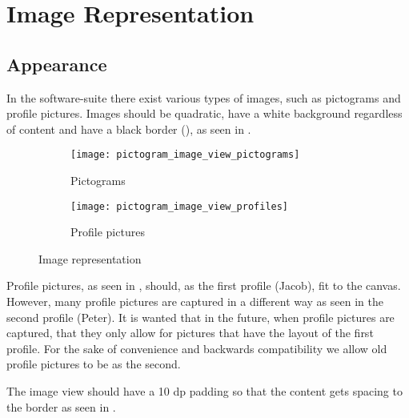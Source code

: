
\chapter{Image Representation}

\section{Appearance}
\label{sec:appearance}
In the \giraf software-suite there exist various types of images, such as pictograms and profile pictures. Images should be quadratic, have a white background regardless of content and have a black border (\colref{}), as seen in . 

\begin{figure}[!htbp]
    \centering

    \begin{subfigure}[t]{0.4\textwidth}
    	\centering
        \texttt{[image: pictogram\_image\_view\_pictograms]}
        \caption{Pictograms}
        \label{fig:pictogram_image_view_pictograms}
    \end{subfigure}
    \hspace{5em} 
    \begin{subfigure}[t]{0.4\textwidth}
    	\centering
        \texttt{[image: pictogram\_image\_view\_profiles]}
        \caption{Profile pictures}
        \label{fig:pictogram_image_view_profiles}
    \end{subfigure}
    
    \caption{Image representation}
    \label{fig:pictogram_image_view}
\end{figure}

\begin{note}
	Profile pictures, as seen in , should, as the first profile (Jacob), fit to the canvas. However, many profile pictures are captured in a different way as seen in the second profile (Peter). It is wanted that in the future, when profile pictures are captured, that they only allow for pictures that have the layout of the first profile. For the sake of convenience and backwards compatibility we allow old profile pictures to be as the second.
\end{note}

\noindent
The image view should have a 10 dp padding so that the content gets spacing to the border as seen in .

